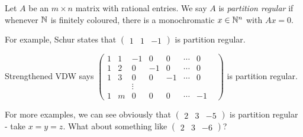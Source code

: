 \documentclass[10pt,a4paper]{article}
\begin{document}
Let $A$ be an $m\times n$ matrix with rational entries. We say $A$ is \emph{partition regular} if whenever $\mathbb{N}$ is finitely coloured, there is a monochromatic $x \in \mathbb{N}^n$ with $Ax=0$.

For example, Schur states that $\begin{pmatrix} 1 & 1 & -1 \end{pmatrix}$ is partition regular.

Strengthened VDW says $\begin{pmatrix} 1 & 1 & -1 & 0 & 0 &\cdots & 0\\ 1 & 2 & 0 & -1&0 & \cdots & 0\\ 1 & 3 & 0 & 0 & -1 & \cdots & 0 \\  &  & \vdots & & & & & \\ 1 & m & 0 & 0& 0& \cdots & -1\end{pmatrix}$ is partition regular.

For more examples, we can see obviously that $\begin{pmatrix} 2 & 3 & -5 \end{pmatrix}$ is partition regular - take $x = y = z$. What about something like $\begin{pmatrix} 2 & 3 & -6 \end{pmatrix}$?
\end{document}
